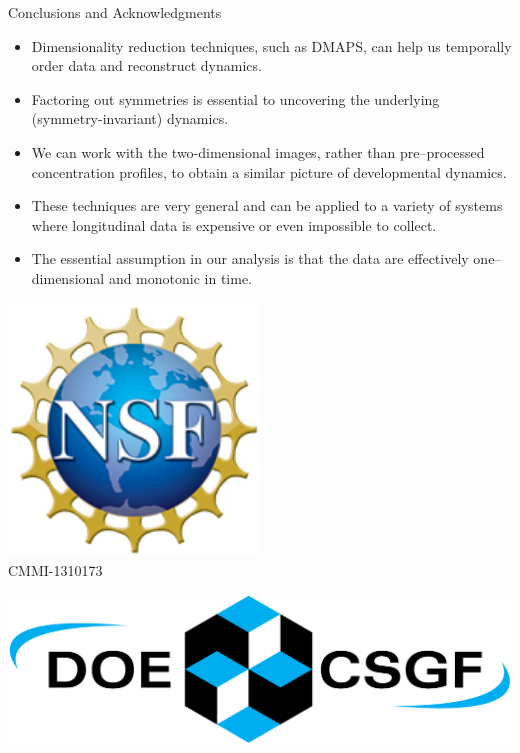 \documentclass[10pt]{beamer}
\begin{document}
\begin{frame}{Conclusions and Acknowledgments}
    \begin{itemize}
        \item Dimensionality reduction techniques, such as DMAPS, can help us temporally order data and reconstruct dynamics.
        \item Factoring out symmetries is essential to uncovering the underlying (symmetry-invariant) dynamics.
        \item We can work with the two-dimensional images, rather than pre--processed concentration profiles, to obtain a similar picture of developmental dynamics.
        \item These techniques are very general and can be applied to a variety of systems where longitudinal data is expensive or even impossible to collect.
        \item The essential assumption in our analysis is that the data are effectively one--dimensional and monotonic in time. 
    \end{itemize}
    
     \vfill
    
    \centering
    \begin{minipage}{0.3\textwidth}
    	\centering
    	\includegraphics[width=0.5\textwidth]{nsf1.jpg}\\
		{\footnotesize CMMI-1310173}
    \end{minipage}
    \hfill
    \begin{minipage}{0.3\textwidth}
	    \centering
    	\includegraphics[width=\textwidth]{CSGF_horiz_1200x360.png}
    \end{minipage}
    

\end{frame}
\end{document}

